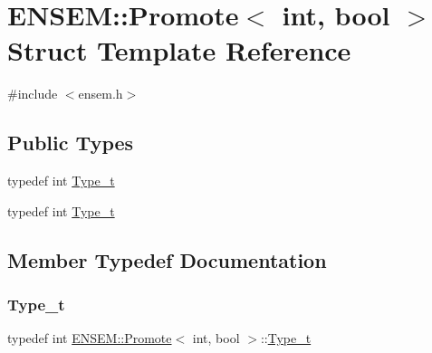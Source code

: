 \hypertarget{structENSEM_1_1Promote_3_01int_00_01bool_01_4}{}\section{E\+N\+S\+EM\+:\+:Promote$<$ int, bool $>$ Struct Template Reference}
\label{structENSEM_1_1Promote_3_01int_00_01bool_01_4}


{\ttfamily \#include $<$ensem.\+h$>$}

\subsection*{Public Types}
\begin{DoxyCompactItemize}
\item 
typedef int \mbox{\hyperlink{structENSEM_1_1Promote_3_01int_00_01bool_01_4_a41a8125f71f49258876367a95577157c}{Type\+\_\+t}}
\item 
typedef int \mbox{\hyperlink{structENSEM_1_1Promote_3_01int_00_01bool_01_4_a41a8125f71f49258876367a95577157c}{Type\+\_\+t}}
\end{DoxyCompactItemize}


\subsection{Member Typedef Documentation}
\mbox{\label{structENSEM_1_1Promote_3_01int_00_01bool_01_4_a41a8125f71f49258876367a95577157c}} 
\subsubsection{\texorpdfstring{Type\_t}{Type\_t}\hspace{0.1cm}{\footnotesize\ttfamily [1/2]}}
{\footnotesize\ttfamily typedef int \mbox{\hyperlink{structENSEM_1_1Promote}{E\+N\+S\+E\+M\+::\+Promote}}$<$ int, bool $>$\+::\mbox{\hyperlink{structENSEM_1_1Promote_3_01int_00_01bool_01_4_a41a8125f71f49258876367a95577157c}{Type\+\_\+t}}}

\mbox{\label{structENSEM_1_1Promote_3_01int_00_01bool_01_4_a41a8125f71f49258876367a95577157c}} 
